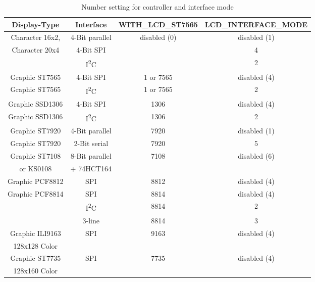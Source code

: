 \begin{description}
\begin{table}[H]
  \begin{center}
    \begin{tabular}{| c | c | c | c|}
    \hline
 Display-Type       &  Interface       & WITH\_LCD\_ST7565 &  LCD\_INTERFACE\_MODE \\
    \hline
    \hline
  Character 16x2,   & 4-Bit parallel   &  disabled (0)     & disabled (1) \\
  Character 20x4    &  4-Bit SPI       &                   &    4   \\
                  & I\textsuperscript{2}C &                &   2    \\
    \hline
  Graphic ST7565    & 4-Bit SPI        &   1 or 7565       &  disabled (4) \\
    \hline
  Graphic ST7565  & I\textsuperscript{2}C & 1 or 7565      &   2 \\
    \hline
  Graphic SSD1306   & 4-Bit SPI        &   1306            &  disabled (4) \\
    \hline
  Graphic SSD1306  & I\textsuperscript{2}C & 1306          &   2 \\
    \hline
  Graphic ST7920    & 4-Bit parallel   &   7920            &  disabled (1) \\
    \hline
  Graphic ST7920    & 2-Bit serial     &   7920            &  5 \\
    \hline
  Graphic ST7108    & 8-Bit parallel   &   7108            &  disabled (6) \\
    or KS0108       &    + 74HCT164    &                   &      \\
    \hline
  Graphic PCF8812   & SPI              &   8812            & disabled (4) \\
    \hline
  Graphic PCF8814   & SPI              &   8814            & disabled (4) \\
                  & I\textsuperscript{2}C & 8814           &   2 \\
                    & 3-line           &   8814            &   3 \\
    \hline
  Graphic ILI9163   & SPI             & 9163              & disabled (4) \\
  128x128 Color     &                 &                   &              \\
    \hline
  Graphic ST7735    & SPI             & 7735              & disabled (4) \\
  128x160 Color     &                 &                   &              \\
    \hline
    \end{tabular}
  \end{center}
  \caption{Number setting for controller and interface mode}
  \label{tab:cod-display}
\end{table}


\end{description}
